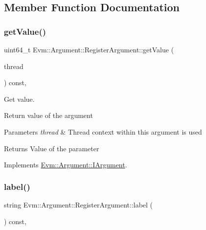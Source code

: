 \subsection{Member Function Documentation}
\mbox{\label{struct_evm_1_1_argument_1_1_register_argument_aa2bb3ec054c1370ccde12b283f9887b1}} 
\subsubsection{\texorpdfstring{get\+Value()}{getValue()}}
{\footnotesize\ttfamily uint64\+\_\+t Evm\+::\+Argument\+::\+Register\+Argument\+::get\+Value (\begin{DoxyParamCaption}\item[{\mbox{\hyperlink{struct_evm_1_1_thread_context}{Thread\+Context}} \&}]{thread }\end{DoxyParamCaption}) const\hspace{0.3cm}{\ttfamily [override]}, {\ttfamily [virtual]}}



Get value. 

Return value of the argument 
\begin{DoxyParams}{Parameters}
{\em thread} & Thread context within this argument is used \\
\hline
\end{DoxyParams}
\begin{DoxyReturn}{Returns}
Value of the parameter 
\end{DoxyReturn}


Implements \mbox{\hyperlink{struct_evm_1_1_argument_1_1_i_argument_af01db10f34498344831877847c2fc038}{Evm\+::\+Argument\+::\+I\+Argument}}.

\mbox{\label{struct_evm_1_1_argument_1_1_register_argument_ab464babd0865a84e76265843c355220b}} 
\subsubsection{\texorpdfstring{label()}{label()}}
{\footnotesize\ttfamily string Evm\+::\+Argument\+::\+Register\+Argument\+::label (\begin{DoxyParamCaption}{ }\end{DoxyParamCaption}) const\hspace{0.3cm}{\ttfamily [override]}, {\ttfamily [virtual]}}



